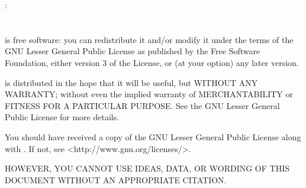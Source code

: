 \begingroup
\setlength{\parindent}{0pt}
\setlength{\parskip}{\baselineskip}
\LibName: \LibDescription\\
\textcopyright{} \LibYear\\
\LibAuthor\\

\LibName is free software: you can redistribute it and/or modify
it under the terms of the GNU Lesser General Public License as
published by the Free Software Foundation, either version 3 of
the License, or (at your option) any later version.

\LibName is distributed in the hope that it will be useful,
but WITHOUT ANY WARRANTY; without even the implied warranty of
MERCHANTABILITY or FITNESS FOR A PARTICULAR PURPOSE. See the
GNU Lesser General Public License for more details.

You should have received a copy of the GNU Lesser General Public
License along with \LibName. If not, see
{\textless}http://www.gnu.org/licenses/{\textgreater}.

HOWEVER, YOU CANNOT USE IDEAS, DATA, OR WORDING OF THIS DOCUMENT
WITHOUT AN APPROPRIATE CITATION.
\endgroup

\clearpage

